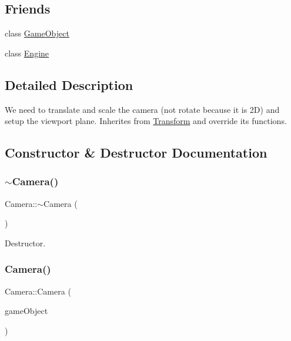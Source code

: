 \subsection*{Friends}
\begin{DoxyCompactItemize}
\item 
class \hyperlink{class_mason_1_1_camera_a00df87c957d8f7ee0fc51f07a0542f4a}{Game\+Object}
\item 
class \hyperlink{class_mason_1_1_camera_a3e1914489e4bed4f9f23cdeab34a43dc}{Engine}
\end{DoxyCompactItemize}


\subsection{Detailed Description}
We need to translate and scale the camera (not rotate because it is 2D) and setup the viewport plane. Inherites from \hyperlink{class_mason_1_1_transform}{Transform} and override its functions. 

\subsection{Constructor \& Destructor Documentation}
\hypertarget{class_mason_1_1_camera_ad1897942d0ccf91052386388a497349f}{}\label{class_mason_1_1_camera_ad1897942d0ccf91052386388a497349f} 
\subsubsection{\texorpdfstring{$\sim$\+Camera()}{~Camera()}}
{\footnotesize\ttfamily Camera\+::$\sim$\+Camera (\begin{DoxyParamCaption}{ }\end{DoxyParamCaption})}



Destructor. 

\hypertarget{class_mason_1_1_camera_af0b5abfa91d40f8338b84744e99aea66}{}\label{class_mason_1_1_camera_af0b5abfa91d40f8338b84744e99aea66} 
\subsubsection{\texorpdfstring{Camera()}{Camera()}}
{\footnotesize\ttfamily Camera\+::\+Camera (\begin{DoxyParamCaption}\item[{std\+::shared\+\_\+ptr$<$ \hyperlink{class_mason_1_1_game_object}{Game\+Object} $>$}]{game\+Object }\end{DoxyParamCaption})\hspace{0.3cm}{\ttfamily [protected]}}



